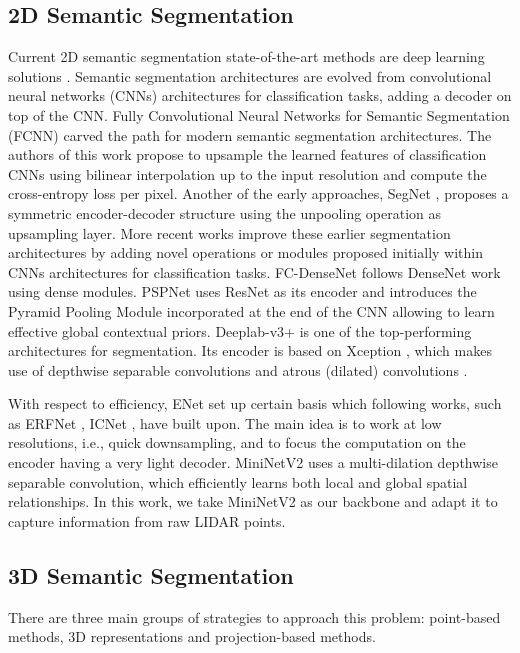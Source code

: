 \documentclass[letterpaper, 10 pt, journal, twoside]{IEEEtran}
\begin{document}
\subsection{2D Semantic Segmentation}

Current 2D semantic segmentation state-of-the-art methods are deep learning solutions \cite{deeplabv3plus2018,chen2017rethinking,jegou2017one,long2015fully}. Semantic segmentation architectures are evolved from convolutional neural networks (CNNs) architectures for classification tasks, adding a decoder on top of the CNN.
Fully Convolutional Neural Networks for Semantic Segmentation (FCNN) \cite{long2015fully} carved the path for modern semantic segmentation architectures. The authors of this work propose to upsample the learned features of classification CNNs using bilinear interpolation up to the input resolution and compute the cross-entropy loss per pixel. 
Another of the early approaches, 
SegNet \cite{badrinarayanan2017segnet}, proposes a symmetric encoder-decoder structure using the unpooling operation as upsampling layer. 
More recent works improve these earlier segmentation architectures by adding novel operations or modules proposed initially within CNNs architectures for classification tasks. FC-DenseNet \cite{jegou2017one} follows DenseNet work \cite{huang2017densely} using dense modules. PSPNet \cite{zhao2017pyramid} uses ResNet \cite{he2016deep} as its encoder and introduces the Pyramid Pooling Module incorporated at the end of the CNN allowing to learn effective global contextual priors. Deeplab-v3+ \cite{deeplabv3plus2018} is one of the top-performing architectures for segmentation.
Its encoder is based on Xception \cite{chollet2016xception}, which makes use of depthwise separable convolutions \cite{sifre2014rigid} and  atrous (dilated) convolutions \cite{YuKoltun2016}.

With respect to efficiency, 
ENet \cite{paszke2016enet} set up certain basis which following works, such as ERFNet \cite{romera2018erfnet}, ICNet \cite{zhao2018icnet}, have built upon. The main idea is to work at low resolutions, i.e., quick downsampling, and to focus the computation on the encoder having a very light decoder. 
MiniNetV2 \cite{alonso2020MininetV2} uses a multi-dilation depthwise separable convolution, which efficiently learns both local and global spatial relationships. 
In this work, we take MiniNetV2 as our backbone and adapt it to capture information from raw LIDAR points. 



\subsection{3D Semantic Segmentation}
There are three main groups of strategies to approach this problem: point-based methods, 3D representations and projection-based methods. 
\end{document}
